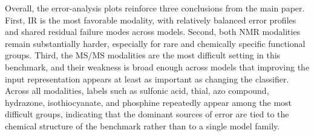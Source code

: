 Overall, the error-analysis plots reinforce three conclusions from the main
paper.
First, IR is the most favorable modality, with relatively balanced error
profiles and shared residual failure modes across models.
Second, both NMR modalities remain substantially harder, especially for rare and
chemically specific functional groups.
Third, the MS/MS modalities are the most difficult setting in this benchmark,
and their weakness is broad enough across models that improving the input
representation appears at least as important as changing the classifier.
Across all modalities, labels such as sulfonic acid, thial, azo compound,
hydrazone, isothiocyanate, and phosphine repeatedly appear among the most
difficult groups, indicating that the dominant sources of error are tied to the
chemical structure of the benchmark rather than to a single model family.
